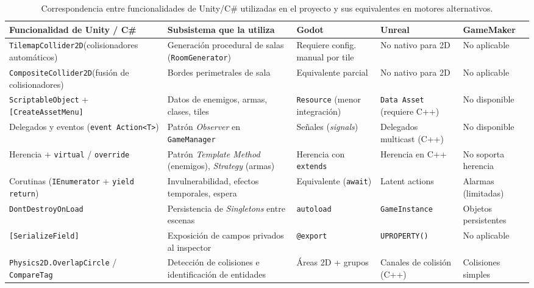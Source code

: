 \begin{table}[H]
\centering
{\scriptsize
\setlength{\tabcolsep}{2pt}
\begin{tabular}{|p{}|p{}|p{}|p{}|p{}|}
\hline
\textbf{Funcionalidad de Unity / C\#} & \textbf{Subsistema que la utiliza} & \textbf{Godot} & \textbf{Unreal} & \textbf{GameMaker} \\ \hline
\texttt{TilemapCollider2D}\newline(colisionadores automáticos) & Generación procedural de salas (\texttt{RoomGenerator}) & Requiere config. manual por tile & No nativo para 2D & No aplicable \\ \hline
\texttt{CompositeCollider2D}\newline(fusión de colisionadores) & Bordes perimetrales de sala & Equivalente parcial & No nativo para 2D & No aplicable \\ \hline
\texttt{ScriptableObject} +\newline\texttt{[CreateAssetMenu]} & Datos de enemigos, armas, clases, tiles & \texttt{Resource} (menor integración) & \texttt{Data Asset} (requiere C++) & No disponible \\ \hline
Delegados y eventos (\texttt{event Action<T>}) & Patrón \textit{Observer} en \texttt{GameManager} & Señales (\textit{signals}) & Delegados multicast (C++) & No disponible \\ \hline
Herencia + \texttt{virtual} / \texttt{override} & Patrón \textit{Template Method} (enemigos), \textit{Strategy} (armas) & Herencia con \texttt{extends} & Herencia en C++ & No soporta herencia \\ \hline
Corutinas (\texttt{IEnumerator} + \texttt{yield return}) & Invulnerabilidad, efectos temporales, espera & Equivalente (\texttt{await}) & Latent actions & Alarmas (limitadas) \\ \hline
\texttt{DontDestroyOnLoad} & Persistencia de \textit{Singletons} entre escenas & \texttt{autoload} & \texttt{GameInstance} & Objetos persistentes \\ \hline
\texttt{[SerializeField]} & Exposición de campos privados al inspector & \texttt{@export} & \texttt{UPROPERTY()} & No aplicable \\ \hline
\texttt{Physics2D.OverlapCircle} / \texttt{CompareTag} & Detección de colisiones e identificación de entidades & Áreas 2D + grupos & Canales de colisión (C++) & Colisiones simples \\ \hline
\end{tabular}
}
\caption{Correspondencia entre funcionalidades de Unity/C\# utilizadas en el proyecto y sus equivalentes en motores alternativos.}
\end{table}

